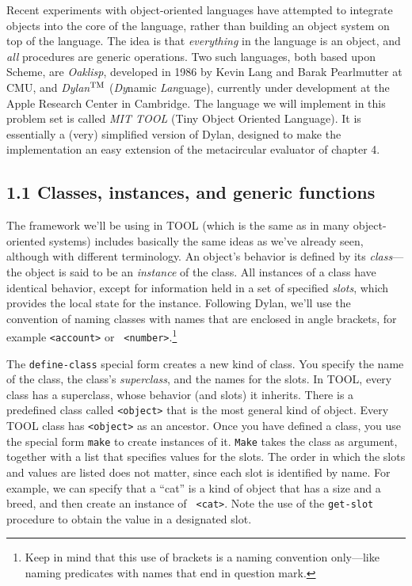 Recent experiments with object-oriented languages have attempted to
integrate objects into the core of the language, rather than building
an object system on top of the language.  The idea is that {\it
everything} in the language is an object, and {\it all} procedures
are generic operations.  Two such languages, both based upon Scheme,
are {\it Oaklisp}, developed in 1986 by Kevin Lang and Barak
Pearlmutter at CMU, and {\it Dylan}$^{\rm TM}$ ({\it Dy\/}namic {\it
Lan\/}guage), currently under development at the Apple Research
Center in Cambridge.  The language we will implement in this problem
set is called {\it MIT TOOL} (Tiny Object Oriented Language).  It is
essentially a (very) simplified version of Dylan, designed to make
the implementation an easy extension of the metacircular evaluator of
chapter 4.

\subsection{1.1 Classes, instances, and generic functions}

The framework we'll be using in TOOL (which is the same as in many
object-oriented systems) includes basically the same ideas as we've
already seen, although with different terminology.  An object's
behavior is defined by its {\it class\/}---the object is said to be an
{\it instance} of the class.  All instances of a class have identical
behavior, except for information held in a set of specified {\it
slots}, which provides the local state for the instance.  Following
Dylan, we'll use the convention of naming classes with names that are
enclosed in angle brackets, for example {\tt <account>} or {\tt
<number>}.\footnote{Keep in mind that this use of brackets is a naming
convention only---like naming predicates with names that end in
question mark.}

The {\tt define-class} special form creates a new kind of class.  You
specify the name of the class, the class's {\it superclass}, and the
names for the slots.  In TOOL, every class has a superclass, whose
behavior (and slots) it inherits.  There is a predefined class called
{\tt <object>} that is the most general kind of object.  Every TOOL
class has {\tt <object>} as an ancestor.  Once you have defined a
class, you use the special form {\tt make} to create instances of it.
{\tt Make} takes the class as argument, together with a list that
specifies values for the slots.  The order in which the slots and
values are listed does not matter, since each slot is identified by
name.  For example, we can specify that a ``cat'' is a kind of object
that has a size and a breed, and then create an instance of {\tt
<cat>}.  Note the use of the {\tt get-slot} procedure to obtain the
value in a designated slot.

